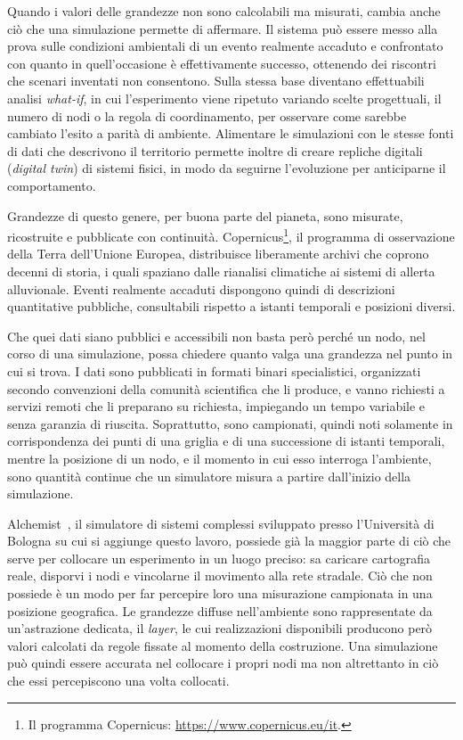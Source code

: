 Quando i valori delle grandezze non sono calcolabili ma misurati, cambia anche ciò
che una simulazione permette di affermare. Il sistema può essere messo alla prova sulle
condizioni ambientali di un evento realmente accaduto e confrontato con quanto in
quell'occasione è effettivamente successo, ottenendo dei riscontri che scenari inventati non
consentono. Sulla stessa base diventano effettuabili analisi \emph{what-if}, in cui
l'esperimento viene ripetuto variando scelte progettuali, il numero di nodi o la regola
di coordinamento, per osservare come sarebbe cambiato l'esito a parità di ambiente.
Alimentare le simulazioni con le stesse fonti di dati che descrivono il territorio permette
inoltre di creare repliche digitali (\emph{digital twin}) di sistemi fisici, in modo da
seguirne l'evoluzione per anticiparne il comportamento.

Grandezze di questo genere, per buona parte del pianeta, sono misurate,
ricostruite e pubblicate con continuità. Copernicus\footnote{Il programma
Copernicus: \url{https://www.copernicus.eu/it}.},
il programma di osservazione della Terra dell'Unione Europea, distribuisce liberamente archivi
che coprono decenni di storia, i quali spaziano dalle rianalisi climatiche ai
sistemi di allerta alluvionale. Eventi realmente accaduti dispongono quindi
di descrizioni quantitative pubbliche, consultabili rispetto a istanti temporali
e posizioni diversi.

Che quei dati siano pubblici e accessibili non basta però perché un nodo,
nel corso di una simulazione, possa chiedere quanto valga una grandezza
nel punto in cui si trova. I dati sono pubblicati in formati binari specialistici,
organizzati secondo convenzioni della comunità scientifica che li produce,
e vanno richiesti a servizi remoti che li preparano su richiesta, impiegando
un tempo variabile e senza garanzia di riuscita. Soprattutto, sono campionati,
quindi noti solamente in corrispondenza dei punti di una griglia e di una
successione di istanti temporali, mentre la posizione di un nodo, e il
momento in cui esso interroga l'ambiente, sono quantità continue che un
simulatore misura a partire dall'inizio della simulazione.

Alchemist~\cite{alchemist}, il simulatore di sistemi complessi sviluppato
presso l'Università di Bologna su cui si aggiunge questo lavoro, possiede già
la maggior parte di ciò che serve per collocare un esperimento in un luogo preciso:
sa caricare cartografia reale, disporvi i nodi e vincolarne il movimento
alla rete stradale. Ciò che non possiede è un modo per far percepire loro una
misurazione campionata in una posizione geografica. Le grandezze diffuse
nell'ambiente sono rappresentate da un'astrazione dedicata, il \emph{layer}, le cui
realizzazioni disponibili producono però valori calcolati da regole fissate
al momento della costruzione. Una simulazione può quindi essere accurata nel
collocare i propri nodi ma non altrettanto in ciò che essi percepiscono una
volta collocati.

